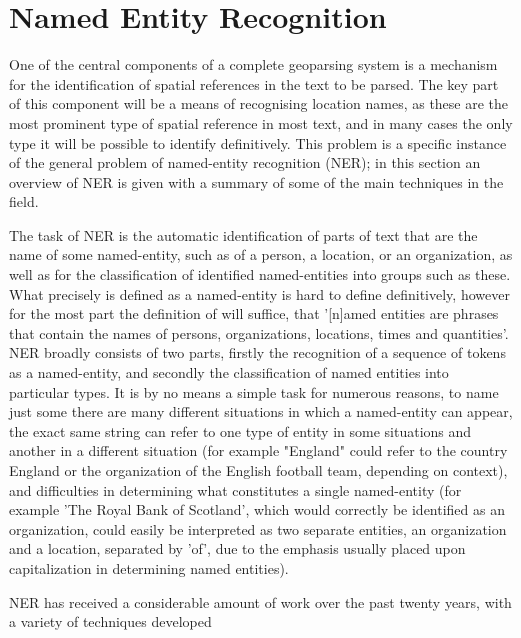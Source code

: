 \documentclass[12pt, a4paper]{report}
\begin{document}
\section{Named Entity Recognition}

One of the central components of a complete geoparsing system is a mechanism for the identification of spatial references in the text to be parsed. The key part of this component will be a means of recognising location names, as these are the most prominent type of spatial reference in most text, and in many cases the only type it will be possible to identify definitively. This problem is a specific instance of the general problem of named-entity recognition (NER); in this section an overview of NER is given with a summary of some of the main techniques in the field.

The task of NER is the automatic identification of parts of text that are the name of some named-entity, such as of a person, a location, or an organization, as well as for the classification of identified named-entities into groups such as these. What precisely is defined as a named-entity is hard to define definitively, however for the most part the definition of \citet{website:conll2002} will suffice, that '[n]amed entities are phrases that contain the names of persons, organizations, locations, times and quantities'. NER broadly consists of two parts, firstly the recognition of a sequence of tokens as a named-entity, and secondly the classification of named entities into particular types. It is by no means a simple task for numerous reasons, to name just some there are many different situations in which a named-entity can appear, the exact same string can refer to one type of entity in some situations and another in a different situation (for example "England" could refer to the country England or the organization of the English football team, depending on context), and difficulties in determining what constitutes a single named-entity (for example 'The Royal Bank of Scotland', which would correctly be identified as an organization, could easily be interpreted as two separate entities, an organization and a location, separated by 'of', due to the emphasis usually placed upon capitalization in determining named entities).

NER has received a considerable amount of work over the past twenty years, with a variety of techniques developed 
\end{document}
